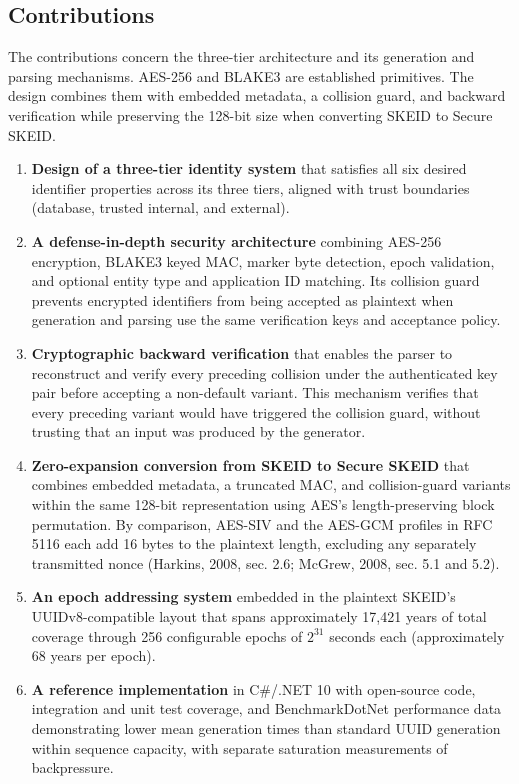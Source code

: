 \documentclass[fleqn,10pt,lineno]{wlpeerj}
\providecommand{\tightlist}{%
  \setlength{\itemsep}{0pt}\setlength{\parskip}{0pt}}
\begin{document}
\newpage

\subsection{Contributions}\label{contributions}

The contributions concern the three-tier architecture and its generation
and parsing mechanisms. AES-256 and BLAKE3 are established primitives.
The design combines them with embedded metadata, a collision guard, and
backward verification while preserving the 128-bit size when converting
SKEID to Secure SKEID.

\begin{enumerate}
\def\labelenumi{\arabic{enumi}.}
\tightlist
\item
  \textbf{Design of a three-tier identity system} that satisfies all six
  desired identifier properties across its three tiers, aligned with
  trust boundaries (database, trusted internal, and external).
\item
  \textbf{A defense-in-depth security architecture} combining AES-256
  encryption, BLAKE3 keyed MAC, marker byte detection, epoch validation,
  and optional entity type and application ID matching. Its collision
  guard prevents encrypted identifiers from being accepted as plaintext
  when generation and parsing use the same verification keys and
  acceptance policy.
\item
  \textbf{Cryptographic backward verification} that enables the parser
  to reconstruct and verify every preceding collision under the
  authenticated key pair before accepting a non-default variant. This
  mechanism verifies that every preceding variant would have triggered
  the collision guard, without trusting that an input was produced by
  the generator.
\item
  \textbf{Zero-expansion conversion from SKEID to Secure SKEID} that
  combines embedded metadata, a truncated MAC, and collision-guard
  variants within the same 128-bit representation using AES's
  length-preserving block permutation. By comparison, AES-SIV and the
  AES-GCM profiles in RFC 5116 each add 16 bytes to the plaintext
  length, excluding any separately transmitted nonce (Harkins, 2008,
  sec. 2.6; McGrew, 2008, sec. 5.1 and 5.2).
\item
  \textbf{An epoch addressing system} embedded in the plaintext SKEID's
  UUIDv8-compatible layout that spans approximately 17,421 years of
  total coverage through 256 configurable epochs of \(2^{31}\) seconds
  each (approximately 68 years per epoch).
\item
  \textbf{A reference implementation} in C\#/.NET 10 with open-source
  code, integration and unit test coverage, and BenchmarkDotNet
  performance data demonstrating lower mean generation times than
  standard UUID generation within sequence capacity, with separate
  saturation measurements of backpressure.
\end{enumerate}
\end{document}
